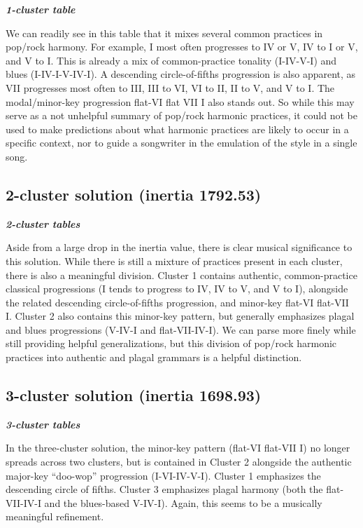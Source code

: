 \textbf{\emph{1-cluster table}}

We can readily see in this table that it mixes several common practices in pop\slash rock harmony. For example, I most often progresses to IV or V, IV to I or V, and V to I. This is already a mix of common-practice tonality (I-IV-V-I) and blues (I-IV-I-V-IV-I). A descending circle-of-fifths progression is also apparent, as VII progresses most often to III, III to VI, VI to II, II to V, and V to I. The modal\slash minor-key progression flat-VI flat VII I also stands out. So while this may serve as a not unhelpful summary of pop\slash rock harmonic practices, it could not be used to make predictions about what harmonic practices are likely to occur in a specific context, nor to guide a songwriter in the emulation of the style in a single song.

\subsection{2-cluster solution (inertia 1792.53)}
\label{2-clustersolutioninertia1792.53}

\textbf{\emph{2-cluster tables}}

Aside from a large drop in the inertia value, there is clear musical significance to this solution. While there is still a mixture of practices present in each cluster, there is also a meaningful division. Cluster 1 contains authentic, common-practice classical progressions (I tends to progress to IV, IV to V, and V to I), alongside the related descending circle-of-fifths progression, and minor-key flat-VI flat-VII I. Cluster 2 also contains this minor-key pattern, but generally emphasizes plagal and blues progressions (V-IV-I and flat-VII-IV-I). We can parse more finely while still providing helpful generalizations, but this division of pop\slash rock harmonic practices into authentic and plagal grammars is a helpful distinction.

\subsection{3-cluster solution (inertia 1698.93)}
\label{3-clustersolutioninertia1698.93}

\textbf{\emph{3-cluster tables}}

In the three-cluster solution, the minor-key pattern (flat-VI flat-VII I) no longer spreads across two clusters, but is contained in Cluster 2 alongside the authentic major-key ``doo-wop'' progression (I-VI-IV-V-I). Cluster 1 emphasizes the descending circle of fifths. Cluster 3 emphasizes plagal harmony (both the flat-VII-IV-I and the blues-based V-IV-I). Again, this seems to be a musically meaningful refinement.

